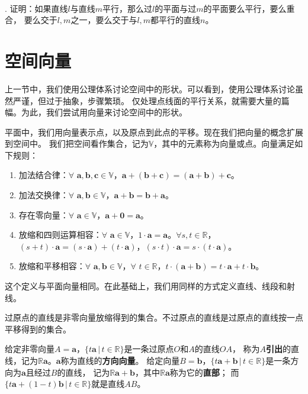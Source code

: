 \documentclass[12pt,UTF8,fontset=none]{ctexbook}
\begin{document}
\begin{xt}
    \mbox{} \\
    . 证明：如果直线$l$与直线$m$平行，那么过$l$的平面与过$m$的平面要么平行，要么重合，
    要么交于$l,m$之一，要么交于与$l,m$都平行的直线$n$。 
\end{xt}


\section{空间向量}

上一节中，我们使用公理体系讨论空间中的形状。可以看到，使用公理体系讨论虽然严谨，但过于抽象，步骤繁琐。
仅处理点线面的平行关系，就需要大量的篇幅。为此，我们尝试用向量来讨论空间中的形状。

平面中，我们用向量表示点，以及原点到此点的平移。现在我们把向量的概念扩展到空间中。
我们把空间看作集合，记为$\mathbb{V}$，其中的元素称为向量或点。向量满足如下规则：

\begin{enumerate}
    \item 加法结合律：$\forall \,\, \mathbf{a}, \mathbf{b}, \mathbf{c} \in \mathbb{V}$，$\mathbf{a}+ (\mathbf{b} + \mathbf{c}) = (\mathbf{a} + \mathbf{b}) + \mathbf{c}$。
    \item 加法交换律：$\forall \,\, \mathbf{a}, \mathbf{b} \in \mathbb{V}$，$\mathbf{a} + \mathbf{b} = \mathbf{b} + \mathbf{a}$。
    \item 存在零向量：$\forall \,\, \mathbf{a} \in \mathbb{V}$，$\mathbf{a} + \mathbf{0} = \mathbf{a}$。
    \item 放缩和四则运算相容：$\forall \,\, \mathbf{a} \in \mathbb{V}$，$1\cdot \mathbf{a} = \mathbf{a}$。$\forall s, t \in \mathbb{R}$，$(s + t)\cdot\mathbf{a} = (s\cdot\mathbf{a}) + (t\cdot\mathbf{a})$，$(s \cdot t)\cdot \mathbf{a} = s \cdot (t\cdot \mathbf{a})$。
    \item 放缩和平移相容：$\forall \,\, \mathbf{a}, \mathbf{b} \in \mathbb{V}$，$\forall \,\, t \in \mathbb{R}$，$t\cdot(\mathbf{a} + \mathbf{b}) = t\cdot\mathbf{a} + t\cdot\mathbf{b}$。
\end{enumerate}

这个定义与平面向量相同。在此基础上，我们用同样的方式定义直线、线段和射线。
\begin{df}
    过原点的直线是非零向量放缩得到的集合。不过原点的直线是过原点的直线按一点平移得到的集合。
\end{df}
给定非零向量$A = \mathbf{a}$，$ \{t\mathbf{a} \, | \, t\in\mathbb{R}\}$是一条过原点$O$和$A$的直线$OA$，
称为$A$\textbf{引出}的直线，记为$\mathbb{R}\mathbf{a}$。$\mathbf{a}$称为直线的\textbf{方向向量}。
给定向量$B = \mathbf{b}$，$ \{t\mathbf{a}+\mathbf{b} \, | \, t\in\mathbb{R}\}$是一条方向为$\mathbf{a}$且经过$B$的直线，
记为$\mathbb{R}\mathbf{a}+\mathbf{b}$，其中$\mathbb{R}\mathbf{a}$称为它的\textbf{直部}；
而$ \{t\mathbf{a}+(1 - t)\mathbf{b} \, | \, t\in\mathbb{R}\}$就是直线$AB$。
\end{document}

